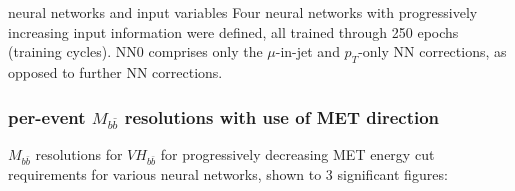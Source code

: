 \begin{frame}{neural networks and input variables}
Four neural networks with progressively increasing input information were defined, all trained through 250 epochs (training cycles). NN0 comprises only the ${\mu}$-in-jet and ${p_{T}}$-only NN corrections, as opposed to further NN corrections.
\begin{center}
\end{center}
\end{frame}

\begin{frame}
\frametitle{per-event $M_{b\bar{b}}$ resolutions with use of MET direction}
${M_{b\bar{b}}}$ resolutions for ${VH_{b\bar{b}}}$ for progressively decreasing MET energy cut requirements for various neural networks, shown to 3 significant figures:
\begin{center}
\end{center}
\end{frame}


